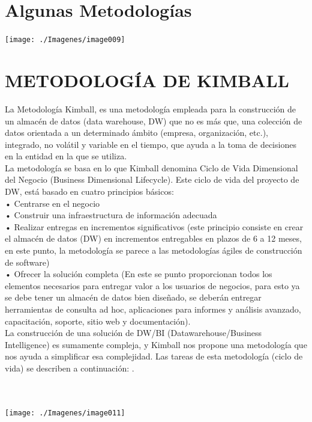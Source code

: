 \section{Algunas Metodologías}

\begin{center}
\texttt{[image: ./Imagenes/image009]}
\end{center}
\newpage
\section{METODOLOGÍA DE KIMBALL}
La Metodología Kimball, es una metodología empleada para la construcción de un almacén de datos (data warehouse, DW) que no es más que, una colección de datos orientada a un determinado ámbito (empresa, organización, etc.), integrado, no volátil y variable en el tiempo, que ayuda a la toma de decisiones en la entidad en la que se utiliza.\\
La metodología se basa en lo que Kimball denomina Ciclo de Vida Dimensional del Negocio (Business Dimensional Lifecycle). Este ciclo de vida del proyecto de DW, está basado en cuatro principios básicos:\\
•	Centrarse en el negocio\\
•	Construir una infraestructura de información adecuada\\
•	Realizar entregas en incrementos significativos (este principio consiste en crear el almacén de datos (DW) en incrementos entregables en plazos de 6 a 12 meses, en este punto, la metodología se parece a las metodologías ágiles de construcción de software)\\
•	Ofrecer la solución completa (En este se punto proporcionan todos los elementos necesarios para entregar valor a los usuarios de negocios, para esto ya se debe tener un almacén de datos bien diseñado, se deberán entregar herramientas de consulta ad hoc, aplicaciones para informes y análisis avanzado, capacitación, soporte, sitio web y documentación).\\
La construcción de una solución de DW/BI (Datawarehouse/Business Intelligence) es sumamente compleja, y Kimball nos propone una metodología que nos ayuda a simplificar esa complejidad. Las tareas de esta metodología (ciclo de vida) se describen a continuación:
.\\\\\

\begin{center}
\texttt{[image: ./Imagenes/image011]}
\end{center}

